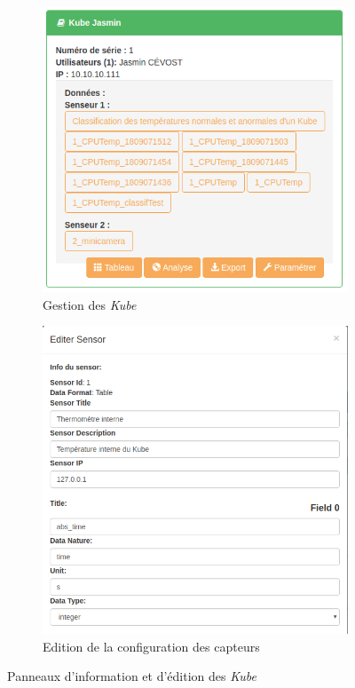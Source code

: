 \documentclass[a4paper]{report}
\begin{document}
\begin{figure}[h!]
	\begin{subfigure}[b]{0.5\textwidth}
		\includegraphics[width=\textwidth]{images/pageKubex2.png}
		\caption{\label{fig:kubeInfo} Gestion des \emph{Kube}}
	\end{subfigure}
	\begin{subfigure}[b]{0.5\textwidth}
		\includegraphics[width=\textwidth]{images/sensor_edit.png}
		\caption{\label{fig:sensorEdit} Edition de la configuration des capteurs}
	\end{subfigure}
	\caption{\label{fig:kubePage} Panneaux d'information et d'édition des \emph{Kube}}
\end{figure}
\end{document}
